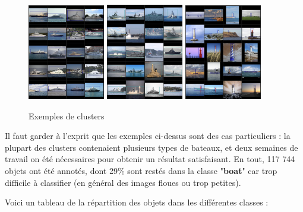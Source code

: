 \begin{figure}[H]
    \centering
    \includegraphics[width=0.3\textwidth]{./img/yachts.png}
    \includegraphics[width=0.3\textwidth]{./img/warships.png}
    \includegraphics[width=0.3\textwidth]{./img/lighthouses.png}
    \caption{Exemples de clusters}
\end{figure}

Il faut garder à l'exprit que les exemples ci-dessus sont des cas particuliers : la plupart des
clusters contenaient plusieurs types de bateaux, et deux semaines de travail on été nécessaires
pour obtenir un résultat satisfaisant. En tout, 117 744 objets ont été annotés, dont 29\% sont restés
dans la classe "\textbf{boat}" car trop difficile à classifier (en général des images floues ou trop petites).

Voici un tableau de la répartition des objets dans les différentes classes : \\


